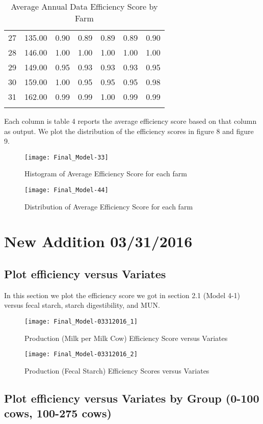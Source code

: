 \documentclass[12pt,]{article}
\begin{document}
\begin{longtable}{l|l|l|l|l|l|l}
  27 & 135.00 & 0.90 & 0.89 & 0.89 & 0.89 & 0.90 \\ 
  28 & 146.00 & 1.00 & 1.00 & 1.00 & 1.00 & 1.00 \\ 
  29 & 149.00 & 0.95 & 0.93 & 0.93 & 0.93 & 0.95 \\ 
  30 & 159.00 & 1.00 & 0.95 & 0.95 & 0.95 & 0.98 \\ 
  31 & 162.00 & 0.99 & 0.99 & 1.00 & 0.99 & 0.99 \\ 
   \hline
\hline
\caption{Average Annual Data Efficiency Score by Farm} 
\label{Table-4}
\end{longtable}Each column is table 4 reports the average efficiency score based on that column as output. We plot the distribution of the efficiency scores in figure 8 and figure 9.

\begin{figure}[H]
\texttt{[image: Final\_Model-33]}
\caption{Histogram of Average Efficiency Score for each farm}
\end{figure}


\begin{figure}[H]
\texttt{[image: Final\_Model-44]}
\caption{Distribution of Average Efficiency Score for each farm}
\end{figure}

\section{New Addition 03/31/2016}
\subsection{Plot efficiency versus Variates}
In this section we plot the efficiency score we got in section 2.1 (Model 4-1) versus fecal starch, starch digestibility, and MUN.

\begin{figure}[H]
\texttt{[image: Final\_Model-03312016\_1]}
\caption{Production (Milk per Milk Cow) Efficiency Score versus Variates}
\end{figure}

\begin{figure}[H]
\texttt{[image: Final\_Model-03312016\_2]}
\caption{Production (Fecal Starch) Efficiency Scores versus Variates}
\end{figure}



\subsection{Plot efficiency versus Variates by Group (0-100 cows, 100-275 cows)}
\end{document}
